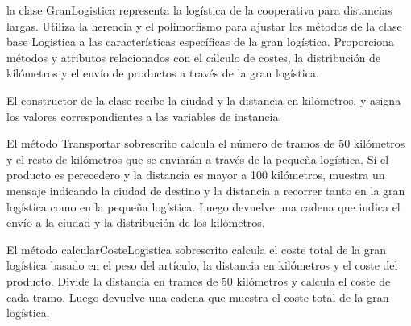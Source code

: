 \documentclass[10pt,a4paper]{article}
\begin{document}
la clase GranLogistica representa la logística de la cooperativa para distancias largas. Utiliza la herencia y el polimorfismo para ajustar los métodos de la clase base Logistica a las características específicas de la gran logística. Proporciona métodos y atributos relacionados con el cálculo de costes, la distribución de kilómetros y el envío de productos a través de la gran logística.

El constructor de la clase recibe la ciudad y la distancia en kilómetros, y asigna los valores correspondientes a las variables de instancia.

El método Transportar sobrescrito calcula el número de tramos de 50 kilómetros y el resto de kilómetros que se enviarán a través de la pequeña logística. Si el producto es perecedero y la distancia es mayor a 100 kilómetros, muestra un mensaje indicando la ciudad de destino y la distancia a recorrer tanto en la gran logística como en la pequeña logística. Luego devuelve una cadena que indica el envío a la ciudad y la distribución de los kilómetros.

El método calcularCosteLogistica sobrescrito calcula el coste total de la gran logística basado en el peso del artículo, la distancia en kilómetros y el coste del producto. Divide la distancia en tramos de 50 kilómetros y calcula el coste de cada tramo. Luego devuelve una cadena que muestra el coste total de la gran logística.
\end{document}
